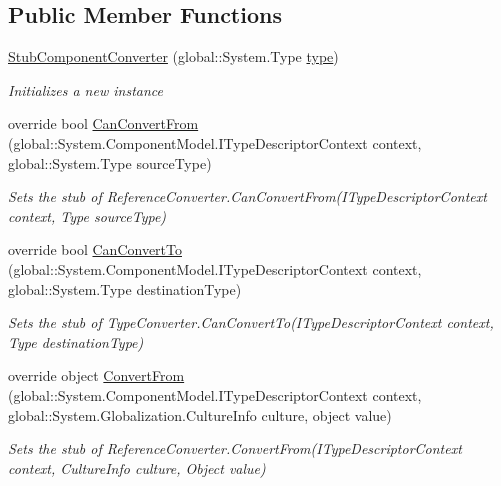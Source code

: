 \subsection*{Public Member Functions}
\begin{DoxyCompactItemize}
\item 
\hyperlink{class_system_1_1_component_model_1_1_fakes_1_1_stub_component_converter_afb8b6ce00b82aee8947a660d50a21928}{Stub\-Component\-Converter} (global\-::\-System.\-Type \hyperlink{jquery-1_810_82-vsdoc_8js_a3940565e83a9bfd10d95ffd27536da91}{type})
\begin{DoxyCompactList}\small\item\em Initializes a new instance\end{DoxyCompactList}\item 
override bool \hyperlink{class_system_1_1_component_model_1_1_fakes_1_1_stub_component_converter_ab41285cd19b318c59669832dad3acd42}{Can\-Convert\-From} (global\-::\-System.\-Component\-Model.\-I\-Type\-Descriptor\-Context context, global\-::\-System.\-Type source\-Type)
\begin{DoxyCompactList}\small\item\em Sets the stub of Reference\-Converter.\-Can\-Convert\-From(\-I\-Type\-Descriptor\-Context context, Type source\-Type)\end{DoxyCompactList}\item 
override bool \hyperlink{class_system_1_1_component_model_1_1_fakes_1_1_stub_component_converter_ade0f0f30ed7263719a7dda246716b16f}{Can\-Convert\-To} (global\-::\-System.\-Component\-Model.\-I\-Type\-Descriptor\-Context context, global\-::\-System.\-Type destination\-Type)
\begin{DoxyCompactList}\small\item\em Sets the stub of Type\-Converter.\-Can\-Convert\-To(\-I\-Type\-Descriptor\-Context context, Type destination\-Type)\end{DoxyCompactList}\item 
override object \hyperlink{class_system_1_1_component_model_1_1_fakes_1_1_stub_component_converter_a91b92852e634ef5f152feed4a2301f99}{Convert\-From} (global\-::\-System.\-Component\-Model.\-I\-Type\-Descriptor\-Context context, global\-::\-System.\-Globalization.\-Culture\-Info culture, object value)
\begin{DoxyCompactList}\small\item\em Sets the stub of Reference\-Converter.\-Convert\-From(\-I\-Type\-Descriptor\-Context context, Culture\-Info culture, Object value)\end{DoxyCompactList}\item 

\end{DoxyCompactItemize}
